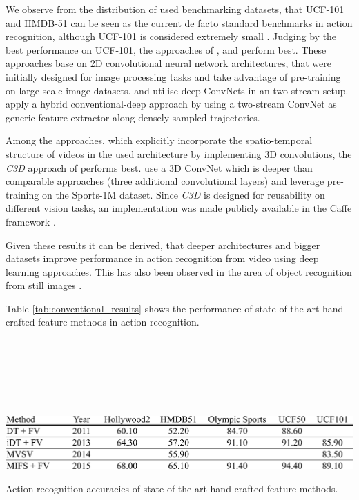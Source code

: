We observe from the distribution of used benchmarking datasets, that UCF-101 and HMDB-51 can be seen as the current de facto standard benchmarks in action recognition, although UCF-101 is considered extremely small \cite{wang_towards_2015}.
Judging by the best performance on UCF-101, the approaches of \textcite{wang_towards_2015}, \textcite{feichtenhofer_convolutional_2016} and \textcite{wang_action_2015} perform best.
These approaches base on 2D convolutional neural network architectures, that were initially designed for image processing tasks and take advantage of pre-training on large-scale image datasets.
\cite{wang_towards_2015} and \cite{feichtenhofer_convolutional_2016} utilise deep ConvNets in an two-stream setup.
\cite{wang_action_2015} apply a hybrid conventional-deep approach by using a two-stream ConvNet as generic feature extractor along densely sampled trajectories.

Among the approaches, which explicitly incorporate the spatio-temporal structure of videos in the used architecture by implementing 3D convolutions, the \textit{C3D} approach of \textcite{tran_learning_2015} performs best.
\textcite{tran_learning_2015} use a 3D ConvNet which is deeper than comparable approaches (three additional convolutional layers) and leverage pre-training on the Sports-1M dataset.
Since \textit{C3D} is designed for reusability on different vision tasks, an implementation was made publicly available in the Caffe framework \cite{jia_caffe:_2014}.

Given these results it can be derived, that deeper architectures and bigger datasets improve performance in action recognition from video using deep learning approaches.
This has also been observed in the area of object recognition from still images \cite{simonyan_very_2014, szegedy_going_2015, he_deep_2015}.

Table \ref{tab:conventional_results} shows the performance of state-of-the-art hand-crafted feature methods in action recognition.

\begin{minipage}[b]{.03\linewidth}
\scriptsize
\cite{wang_action_2013}\\
\cite{wang_action_2013}\\
\cite{cai_multi-view_2014}\\
\cite{lan_beyond_2015}\\
\\
\end{minipage}
\begin{minipage}[b]{.96\linewidth}
\begin{table}[H]
    \centering
    \includegraphics[width=\textwidth]{img_evaluation/conventional_results}
    \caption{Action recognition accuracies of state-of-the-art hand-crafted feature methods.}
    \label{tab:conventional_results}
\end{table}
\end{minipage}

